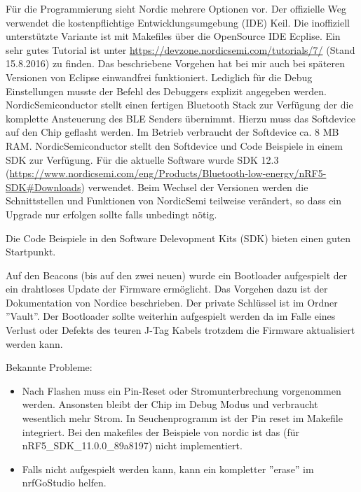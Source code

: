 \documentclass[11pt,ngerman]{scrartcl} %
\begin{document}
Für die Programmierung sieht Nordic mehrere Optionen vor. Der offizielle Weg verwendet die kostenpflichtige Entwicklungsumgebung (IDE) Keil. Die inoffiziell unterstützte Variante ist mit Makefiles über die OpenSource IDE Ecplise. Ein sehr gutes Tutorial ist unter \url{https://devzone.nordicsemi.com/tutorials/7/} (Stand 15.8.2016) zu finden. Das beschriebene Vorgehen hat bei mir auch bei späteren Versionen von Eclipse einwandfrei funktioniert. Lediglich für die Debug Einstellungen musste der Befehl des Debuggers explizit angegeben werden. 
NordicSemiconductor stellt einen fertigen Bluetooth Stack zur Verfügung der die komplette Ansteuerung des BLE Senders übernimmt. Hierzu muss das Softdevice auf den Chip geflasht werden. Im Betrieb verbraucht der Softdevice ca. 8 MB RAM.
NordicSemiconductor stellt den Softdevice und Code Beispiele in einem SDK zur Verfügung. Für die aktuelle Software wurde SDK 12.3 (\url{https://www.nordicsemi.com/eng/Products/Bluetooth-low-energy/nRF5-SDK\#Downloads}) verwendet. Beim Wechsel der Versionen werden die Schnittstellen und Funktionen von NordicSemi teilweise verändert, so dass ein Upgrade nur erfolgen sollte falls unbedingt nötig.

Die Code Beispiele in den Software Delevopment Kits (SDK) bieten einen guten Startpunkt. 

Auf den Beacons (bis auf den zwei neuen) wurde ein Bootloader aufgespielt der ein drahtloses Update der Firmware ermöglicht. Das Vorgehen dazu ist der Dokumentation von Nordice beschrieben. Der private Schlüssel ist im Ordner ''Vault''. Der Bootloader sollte weiterhin aufgespielt werden da im Falle eines Verlust oder Defekts des teuren J-Tag Kabels trotzdem die Firmware aktualisiert werden kann.


Bekannte Probleme:
\begin{itemize}
\item  Nach Flashen muss ein Pin-Reset oder Stromunterbrechung vorgenommen werden. Ansonsten bleibt der Chip im Debug Modus und verbraucht wesentlich mehr Strom.  In Seuchenprogramm ist der Pin reset im Makefile integriert. Bei den makefiles der Beispiele von nordic ist das (für nRF5\_SDK\_11.0.0\_89a8197) nicht implementiert.
\item Falls nicht aufgespielt werden kann, kann ein kompletter ''erase'' im nrfGoStudio helfen.
\end{itemize}
\end{document}

